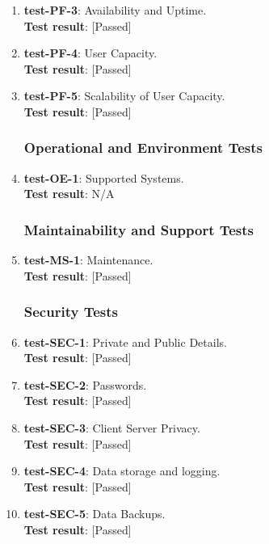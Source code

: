 \documentclass[12pt, titlepage]{article}
\begin{document}
\begin{enumerate}
	\item{\textbf{test-PF-3}}: Availability and Uptime.\\
	\textbf{Test result}: [Passed]
	
	\item{\textbf{test-PF-4}}: User Capacity.\\
	\textbf{Test result}: [Passed]
	
	\item{\textbf{test-PF-5}}: Scalability of User Capacity.\\
	\textbf{Test result}: [Passed]
	
\subsubsection{Operational and Environment Tests}
	\item{\textbf{test-OE-1}}: Supported Systems.\\
	\textbf{Test result}: N/A
	
\subsubsection{Maintainability and Support Tests}
	\item{\textbf{test-MS-1}}: Maintenance.\\
	\textbf{Test result}: [Passed]
	
\subsubsection{Security Tests}
	\item{\textbf{test-SEC-1}}: Private and Public Details.\\
	\textbf{Test result}: [Passed]
	
	\item{\textbf{test-SEC-2}}: Passwords.\\
	\textbf{Test result}: [Passed]
	
	\item{\textbf{test-SEC-3}}: Client Server Privacy.\\
	\textbf{Test result}: [Passed]
	
	\item{\textbf{test-SEC-4}}: Data storage and logging.\\
	\textbf{Test result}: [Passed]
	
	\item{\textbf{test-SEC-5}}: Data Backups.\\
	\textbf{Test result}: [Passed]
	

\end{enumerate}
\end{document}
